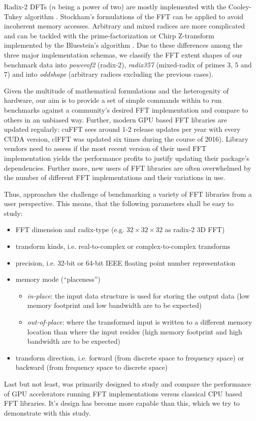 Radix-2 DFTs ($n$ being a power of two) are mostly implemented with the Cooley-Tukey algorithm \cite{cooley1965algorithm}. Stockham's formulations of the FFT can be applied \cite{FFTW05} to avoid incoherent memory accesses. Arbitrary and mixed radices are more complicated and can be tackled with the prime-factorization or Chirp Z-transform implemented by the Bluestein's algorithm \cite{bluestein}. Due to these differences among the three major implementation schemas, we classify the FFT extent shapes of our benchmark data into \emph{powerof2} (radix-2), \emph{radix357} (mixed-radix of primes 3, 5 and 7) and into \emph{oddshape} (arbitrary radices excluding the previous cases). 

Given the multitude of mathematical formulations and the heterogenity of hardware, our aim is to provide a set of simple commands within \gearshifft{} to run benchmarks against a community's desired FFT implementation and compare to others in an unbiased way. Further, modern GPU based FFT libraries are updated regularly: cuFFT sees around 1-2 release updates per year with every CUDA version, clFFT was updated six times during the course of 2016). Library vendors need to assess if the most recent version of their used FFT implementation yields the performance profits to justify updating their package's dependencies. Further more, new users of FFT libraries are often overwhelmed by the number of different FFT implementations and their variations in use. 

Thus, \gearshifft{} approaches the challenge of benchmarking a variety of FFT libraries from a user perspective. This means, that the following parameters shall be easy to study:

\begin{itemize}
\item FFT dimension and radix-type (e.g. $32{\times}32{\times}32$ as radix-2 3D FFT)
\item transform kinds, i.e. real-to-complex or complex-to-complex transforms
\item precision, i.e. 32-bit or 64-bit IEEE floating point number representation
\item memory mode (``placeness'')
  \begin{itemize}
  \item \emph{in-place}: the input data structure is used for storing the output data (low memory footprint and low bandwidth are to be expected)
  \item \emph{out-of-place}:  where the transformed input is written to a different memory location than where the input resides (high memory footprint and high bandwidth are to be expected)
  \end{itemize}
\item transform direction, i.e. forward (from discrete space to frequency space) or backward (from frequency space to discrete space)
\end{itemize}
 
Last but not least, \gearshifft{} was primarily designed to study and compare the performance of GPU accelerators running FFT implementations versus classical CPU based FFT libraries. It's design has become more capable than this, which we try to demonstrate with this study.   
